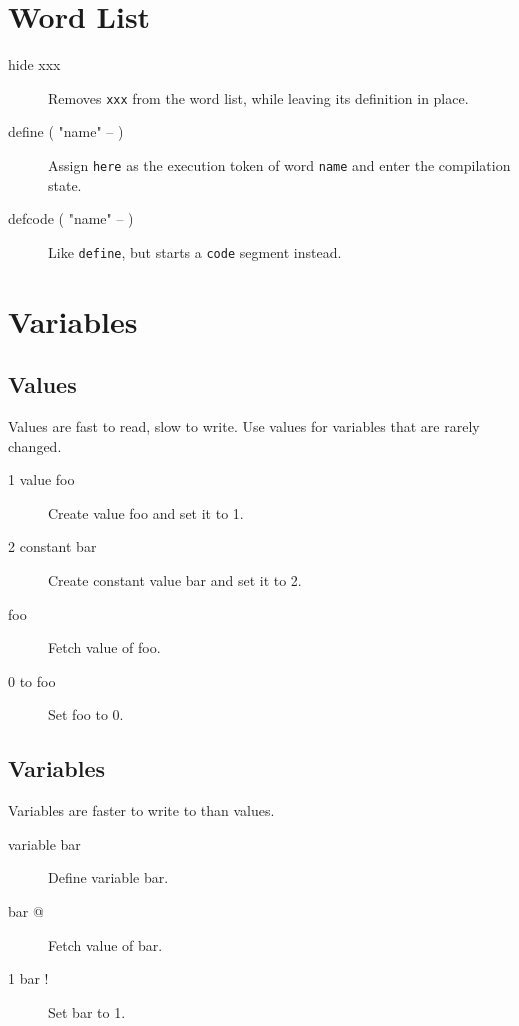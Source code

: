 \section{Word List}

\begin{description}

\item[hide xxx] Removes \texttt{xxx} from the word list, while leaving its definition in place.
\item[define ( "name" -- ) ] Assign \texttt{here} as the execution token of word \texttt{name} and enter the compilation state.
\item[defcode ( "name" -- ) ] Like \texttt{define}, but starts a \texttt{code} segment instead.

\end{description}

\section{Variables}

\subsection{Values}

Values are fast to read, slow to write. Use values for variables
that are rarely changed.

\begin{description}
\item[1 value foo] Create value foo and set it to 1.
\item[2 constant bar] Create constant value bar and set it to 2.
\item[foo] Fetch value of foo.
\item[0 to foo] Set foo to 0.
\end{description}

\subsection{Variables}

Variables are faster to write to than values.

\begin{description}
\item[variable bar] Define variable bar.
\item[bar @] Fetch value of bar.
\item[1 bar !] Set bar to 1.
\end{description}

